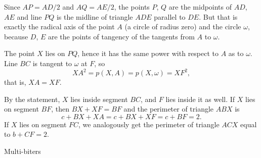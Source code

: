 {    Since $AP = AD/2$ and $AQ = AE/2$, the points $P$, $Q$ are the midpoints of $AD$, $AE$ and line $PQ$ is the midline of triangle $ADE$ parallel to $DE$. But that is exactly the radical axis of the point $A$ (a circle of radius zero) and the circle $\omega$, because $D$, $E$ are the points of tangency of the tangents from $A$ to $\omega$.

    The point $X$ lies on $PQ$, hence it has the same power with respect to $A$ as to $\omega$. Line $BC$ is tangent to $\omega$ at $F$, so
    $$
    XA^2 = p(X,A) = p(X,\omega) = XF^2,
    $$
    that is, $XA = XF$.

    By the statement, $X$ lies inside segment $BC$, and $F$ lies inside it as well. If $X$ lies on segment $BF$, then $BX + XF = BF$ and the perimeter of triangle $ABX$ is
    $$
    c + BX + XA = c + BX + XF = c + BF = 2.
    $$
    If $X$ lies on segment $FC$, we analogously get the perimeter of triangle $ACX$ equal to $b + CF = 2$.
}

\secc Multi-biters

